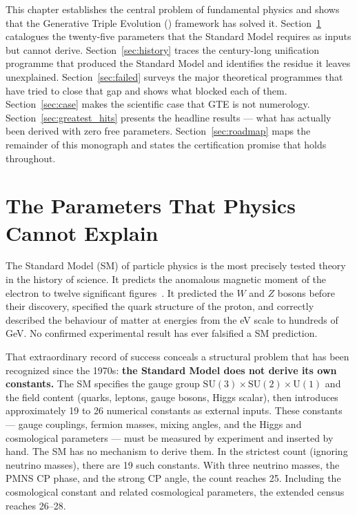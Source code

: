 \documentclass[11pt,openany]{book}
\theoremstyle{remark}
\newcommand{\GTE}{\text{GTE}}
\begin{document}
This chapter establishes the central problem of fundamental physics and shows that the
Generative Triple Evolution (\GTE) framework has solved it.
Section~\ref{sec:parameters} catalogues the twenty-five parameters that the Standard
Model requires as inputs but cannot derive.
Section~\ref{sec:history} traces the century-long unification programme that produced
the Standard Model and identifies the residue it leaves unexplained.
Section~\ref{sec:failed} surveys the major theoretical programmes that have tried to
close that gap and shows what blocked each of them.
Section~\ref{sec:case} makes the scientific case that GTE is not numerology.
Section~\ref{sec:greatest_hits} presents the headline results --- what has actually been
derived with zero free parameters.
Section~\ref{sec:roadmap} maps the remainder of this monograph and states the
certification promise that holds throughout.

\section{The Parameters That Physics Cannot Explain}
\label{sec:parameters}

The Standard Model (SM) of particle physics is the most precisely tested theory in the
history of science.
It predicts the anomalous magnetic moment of the electron to twelve significant
figures~\cite{ParticleDataGroup2024}.
It predicted the $W$ and $Z$ bosons before their discovery, specified the quark
structure of the proton, and correctly described the behaviour of matter at energies
from the eV scale to hundreds of GeV.
No confirmed experimental result has ever falsified a SM prediction.

That extraordinary record of success conceals a structural problem that has been
recognized since the 1970s: \textbf{the Standard Model does not derive its own
constants.} The SM specifies the gauge group
$\mathrm{SU}(3)\times\mathrm{SU}(2)\times\mathrm{U}(1)$ and the field content
(quarks, leptons, gauge bosons, Higgs scalar), then introduces approximately 19 to 26
numerical constants as external inputs.
These constants --- gauge couplings, fermion masses, mixing angles, and the Higgs and
cosmological parameters --- must be measured by experiment and inserted by hand.
The SM has no mechanism to derive them.
In the strictest count (ignoring neutrino masses), there are 19 such constants.
With three neutrino masses, the PMNS CP phase, and the strong CP angle, the count
reaches 25.
Including the cosmological constant and related cosmological parameters, the
extended census reaches 26--28.
\end{document}
